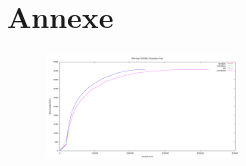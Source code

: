 \documentclass[9pt,a4paper]{sig-alternate}
\begin{document}



%
%





\section{Annexe}

\begin{figure}[htp]
  \centering
  \includegraphics[width=0.45\textwidth]{../img/evolution.png}
\end{figure}
\end{document}
